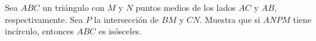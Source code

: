 Sea $ABC$ un triángulo con $M$ y $N$ puntos medios de los lados $AC$ y $AB$, respectivamente. Sea $P$ la intersección de $BM$ y $CN$. Muestra que si $ANPM$ tiene incírculo, entonces $ABC$ es isósceles.